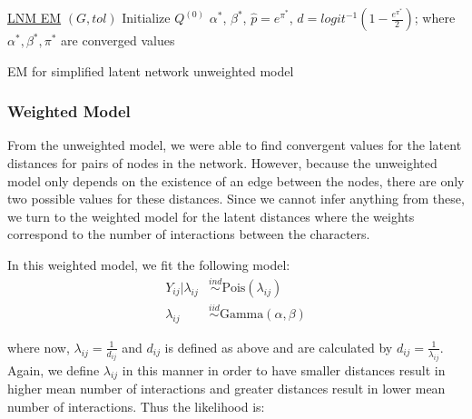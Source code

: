 \documentclass{article}
\begin{document}
\begin{algorithm*}
    \underline{LNM EM} $(G, tol)$\;
    Initialize $Q^{(0)}$
     \Return $\alpha^*$, $\beta^*$, $\hat{p} =  e^{\pi^*}$, $\hat{d} = logit^{-1}(1 - \frac{e^{\pi^*}}{2})$; where $\alpha^*, \beta^*, \pi^*$ are converged values \
    \caption{EM for simplified latent network unweighted model}
    \label{EM_alg_unweighted}
\end{algorithm*}

\subsubsection{Weighted Model}
From the unweighted model, we were able to find convergent values for the latent distances for pairs of nodes in the network. However, because the unweighted model only depends on the existence of an edge between the nodes, there are only two possible values for these distances. Since we cannot infer anything from these, we turn to the weighted model for the latent distances where the weights correspond to the number of interactions between the characters.  

In this weighted model, we fit the following model:
\begin{align*}
Y_{ij} | \lambda_{ij} &\overset{ind}\sim \text{Pois}(\lambda_{ij}) \\
\lambda_{ij} &\overset{iid}\sim \text{Gamma}(\alpha, \beta)
\end{align*}

where now, $\lambda_{ij} = \frac{1}{d_{ij}}$ and $d_{ij}$ is defined as above and are calculated by $d_{ij} = \frac{1}{\lambda_{ij}}$. Again, we define $\lambda_{ij}$ in this manner in order to have smaller distances result in higher mean number of interactions and greater distances result in lower mean number of interactions. Thus the likelihood is:
\end{document}
